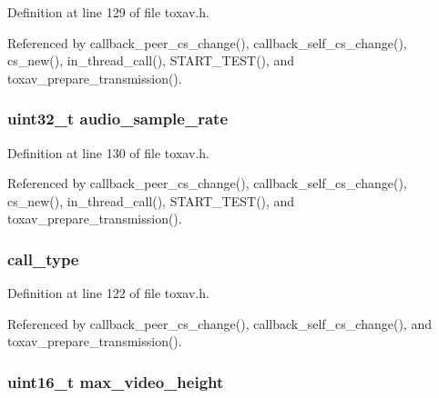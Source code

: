 Definition at line 129 of file toxav.\+h.



Referenced by callback\+\_\+peer\+\_\+cs\+\_\+change(), callback\+\_\+self\+\_\+cs\+\_\+change(), cs\+\_\+new(), in\+\_\+thread\+\_\+call(), S\+T\+A\+R\+T\+\_\+\+T\+E\+S\+T(), and toxav\+\_\+prepare\+\_\+transmission().

\hypertarget{struct___tox_av_c_settings_a66da4482e934a2700e07a39fa0838559}{
\subsubsection[{audio\+\_\+sample\+\_\+rate}]{\setlength{\rightskip}{0pt plus 5cm}uint32\+\_\+t audio\+\_\+sample\+\_\+rate}}\label{struct___tox_av_c_settings_a66da4482e934a2700e07a39fa0838559}


Definition at line 130 of file toxav.\+h.



Referenced by callback\+\_\+peer\+\_\+cs\+\_\+change(), callback\+\_\+self\+\_\+cs\+\_\+change(), cs\+\_\+new(), in\+\_\+thread\+\_\+call(), S\+T\+A\+R\+T\+\_\+\+T\+E\+S\+T(), and toxav\+\_\+prepare\+\_\+transmission().

\hypertarget{struct___tox_av_c_settings_af8142c751283bdc9d14609ab3009b920}{
\subsubsection[{call\+\_\+type}]{ call\+\_\+type}}\label{struct___tox_av_c_settings_af8142c751283bdc9d14609ab3009b920}


Definition at line 122 of file toxav.\+h.



Referenced by callback\+\_\+peer\+\_\+cs\+\_\+change(), callback\+\_\+self\+\_\+cs\+\_\+change(), and toxav\+\_\+prepare\+\_\+transmission().

\hypertarget{struct___tox_av_c_settings_a4fef4b2fa1a8ae8446314ad0af4ce698}{
\subsubsection[{max\+\_\+video\+\_\+height}]{\setlength{\rightskip}{0pt plus 5cm}uint16\+\_\+t max\+\_\+video\+\_\+height}}\label{struct___tox_av_c_settings_a4fef4b2fa1a8ae8446314ad0af4ce698}


